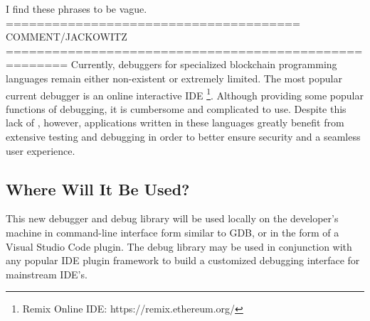 \documentclass[]{article}
\begin{document}
I find these phrases to be vague.
====================================== COMMENT/JACKOWITZ ======================================================
\fi
Currently, debuggers for specialized blockchain programming languages remain either non-existent or extremely limited. The most popular current debugger is an online interactive IDE \footnote{Remix Online IDE: https://remix.ethereum.org/}. Although providing some popular functions of debugging, it is cumbersome and complicated to use. Despite this lack of , however, applications written in these languages greatly benefit from extensive testing and debugging in order to better ensure security and a seamless user experience.

\subsection{Where Will It Be Used?}
\iffalse
====================================== COMMENT/Mat ======================================================
What is GDB? Before you start using acronyms, you should first detail the full name of the item and then put the acronym in parenthesis. At this point, you can use the acronym. For example, I might say, " at the United Nations (UN), I saw Stalin. It was a weird experience seeing Stalin at the UN." I 1.) first introduced the name with the acronym in parenthesis; 2.) you can use the acronym now without needing to use the whole name. 
====================================== COMMENT/Mat ======================================================

====================================== COMMENT/JACKOWITZ ======================================================
I think it beneficial for you to be much more specific about the "debug library", which seems to be at the core of what you are proposing.
====================================== COMMENT/JACKOWITZ ======================================================
\fi

This new debugger and debug library will be used locally on the developer's machine in command-line interface form similar to GDB, or in the form of a Visual Studio Code plugin. The debug library may be used in conjunction with any popular IDE plugin framework to build a customized debugging interface for mainstream IDE's. 
\end{document}
